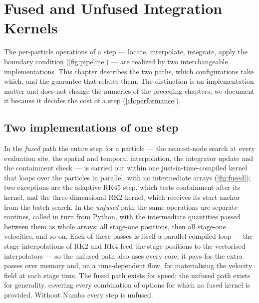 \chapter{Fused and Unfused Integration Kernels}\label{ch:fused}

The per-particle operations of a step --- locate, interpolate, integrate, apply the boundary
condition (\cref{fig:pipeline}) --- are realized by two interchangeable implementations. This
chapter describes the two paths, which configurations take which, and the guarantee that relates
them. The distinction is an implementation matter and does not change the numerics of the preceding
chapters; we document it because it decides the cost of a step (\cref{ch:performance}).

\section{Two implementations of one step}\label{sec:fused-two}

In the \emph{fused} path the entire step for a particle --- the nearest-node search at every
evaluation site, the spatial and temporal interpolation, the integrator update and the containment
check --- is carried out within one just-in-time-compiled kernel that loops over the particles in
parallel, with no intermediate arrays (\cref{fig:fused}); two exceptions are the adaptive RK45 step,
which tests containment after its kernel, and the three-dimensional RK2 kernel, which receives its start
anchor from the batch search. In the \emph{unfused} path the same
operations are separate routines, called in turn from Python, with the intermediate quantities
passed between them as whole arrays: all stage-one positions, then all stage-one velocities, and so
on. Each of these passes is itself a parallel compiled loop --- the stage interpolations of RK2 and
RK4 feed the stage positions to the vectorised interpolators --- so the unfused path also uses every
core; it pays for the extra passes over memory and, on a time-dependent flow, for materialising the
velocity field at each stage time. The fused path exists for speed; the unfused path exists for
generality, covering every combination of options for which no fused kernel is provided. Without
Numba every step is unfused.

